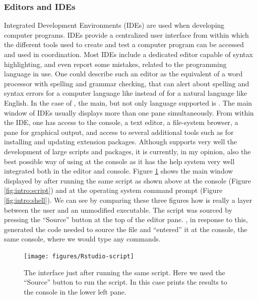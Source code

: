 \documentclass[krantz2]{krantz}\usepackage{knitr}
\begin{document}
\subsubsection{Editors and IDEs}

Integrated Development Environments (IDEs) are used when developing computer programs. IDEs provide a centralized user interface from within which the different tools used to create and test a computer program can be accessed and used in coordination. Most IDEs include a dedicated editor capable of syntax highlighting, and even report some mistakes, related to the programming language in use. One could describe such an editor as the equivalent of a word processor with spelling and grammar checking, that can alert about spelling and syntax errors for a computer language like \Rlang instead of for a natural language like English. In the case of \RStudio, the main, but not only language supported is \Rlang. The main window of IDEs usually displays more than one pane simultaneously. From within the \RStudio IDE, one has access to the \Rpgrm console, a text editor, a file-system browser, a pane for graphical output, and access to several additional tools such as for installing and updating extension packages. Although \RStudio supports very well the development of large scripts and packages, it is currently, in my opinion, also the best possible way of using \Rpgrm at the console as it has the \Rpgrm help system very well integrated both in the editor and \Rlang console. Figure \ref{fig:intro:rstudio} shows the main window displayed by \RStudio after running the same script as shown above at the \Rpgrm console (Figure \ref{fig:intro:script}) and at the operating system command prompt (Figure \ref{fig:intro:shell}). We can see by comparing these three figures how \RStudio is really a layer between the user and an unmodified \Rpgrm executable. The script was sourced by pressing the ``Source'' button at the top of the editor pane. \RStudio, in response to this, generated the code needed to source the file and ``entered'' it at the console, the same console, where we would type any \Rpgrm commands.

\begin{figure}
  \centering
  \texttt{[image: figures/Rstudio-script]}
  \caption[Script in Rstudio]{The \RStudio interface just after running the same script. Here we used the ``Source'' button to run the script. In this case \Rpgrm prints the results to the \Rpgrm console in the lower left pane.}\label{fig:intro:rstudio}
\end{figure}
\end{document}

